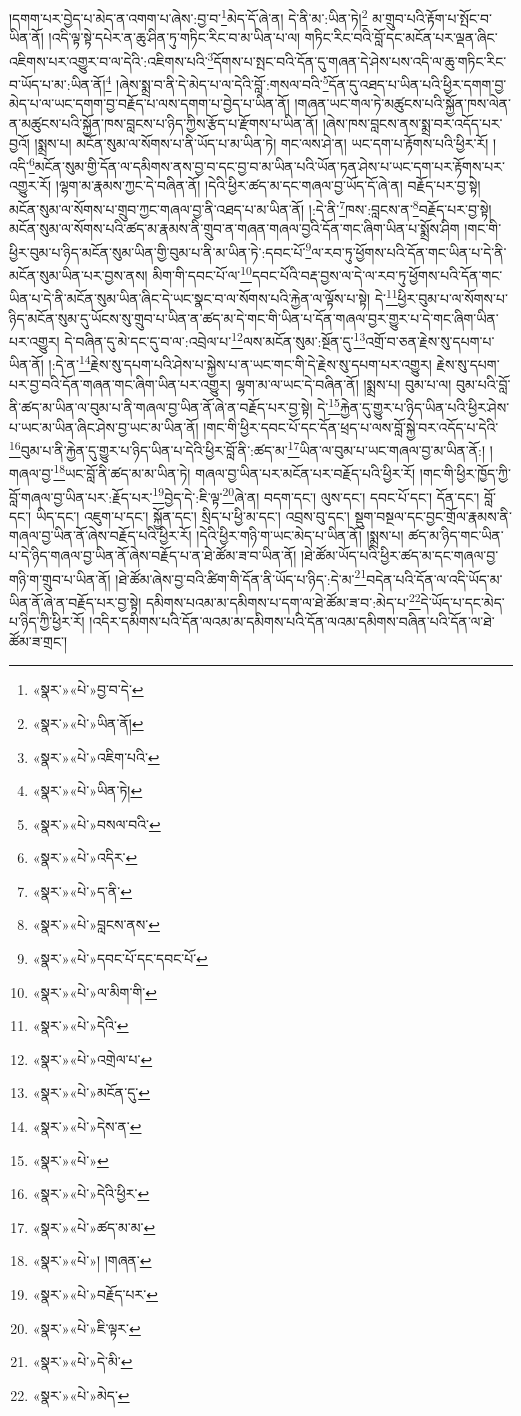 །དགག་པར་བྱེད་པ་མེད་ན་འགག་པ་ཞེས་:བྱ་བ་\footnote{«སྣར་»«པེ་»བྱ་བ་དེ་}མེད་དོ་ཞེ་ན། དེ་ནི་མ་:ཡིན་ཏེ།\footnote{«སྣར་»«པེ་»ཡིན་ནོ།} མ་གྲུབ་པའི་རྟོག་པ་སྤོང་བ་ཡིན་ནོ། །འདི་ལྟ་སྟེ་དཔེར་ན་ཆུ་ཤིན་ཏུ་གཏིང་རིང་བ་མ་ཡིན་པ་ལ། གཏིང་རིང་བའི་བློ་དང་མངོན་པར་ལྡན་ཞིང་འཇིགས་པར་འགྱུར་བ་ལ་དེའི་:འཇིགས་པའི་\footnote{«སྣར་»«པེ་»འཇིག་པའི་}དོགས་པ་སྤང་བའི་དོན་དུ་གཞན་དེ་ཤེས་པས་འདི་ལ་ཆུ་གཏིང་རིང་བ་ཡོད་པ་མ་:ཡིན་ནོ།\footnote{«སྣར་»«པེ་»ཡིན་ཏེ།} །ཞེས་སྨྲ་བ་ནི་དེ་མེད་པ་ལ་དེའི་བློ་:གསལ་བའི་\footnote{«སྣར་»«པེ་»བསལ་བའི་}དོན་དུ་འཐད་པ་ཡིན་པའི་ཕྱིར་དགག་བྱ་མེད་པ་ལ་ཡང་དགག་བྱ་བརྗོད་པ་ལས་དགག་པ་བྱེད་པ་ཡིན་ནོ། །གཞན་ཡང་གལ་ཏེ་མཚུངས་པའི་སྐྱོན་ཁས་ལེན་ན་མཚུངས་པའི་སྐྱོན་ཁས་བླངས་པ་ཉིད་ཀྱིས་རྩོད་པ་རྫོགས་པ་ཡིན་ནོ། །ཞེས་ཁས་བླངས་ནས་སྨྲ་བར་འདོད་པར་བྱའོ། །སྨྲས་པ། མངོན་སུམ་ལ་སོགས་པ་ནི་ཡོད་པ་མ་ཡིན་ཏེ། གང་ལས་ཤེ་ན། ཡང་དག་པ་རྟོགས་པའི་ཕྱིར་རོ། །འདི་\footnote{«སྣར་»«པེ་»འདིར་}མངོན་སུམ་གྱི་དོན་ལ་དམིགས་ནས་བྱ་བ་དང་བྱ་བ་མ་ཡིན་པའི་ཡོན་ཏན་ཤེས་པ་ཡང་དག་པར་རྟོགས་པར་འགྱུར་རོ། །ལྷག་མ་རྣམས་ཀྱང་དེ་བཞིན་ནོ། །དེའི་ཕྱིར་ཚད་མ་དང་གཞལ་བྱ་ཡོད་དོ་ཞེ་ན། བརྗོད་པར་བྱ་སྟེ། མངོན་སུམ་ལ་སོགས་པ་གྲུབ་ཀྱང་གཞལ་བྱ་ནི་འཐད་པ་མ་ཡིན་ནོ། །:དེ་ནི་\footnote{«སྣར་»«པེ་»ད་ནི་}ཁས་:བླངས་ན་\footnote{«སྣར་»«པེ་»བླངས་ནས་}བརྗོད་པར་བྱ་སྟེ། མངོན་སུམ་ལ་སོགས་པའི་ཚད་མ་རྣམས་ནི་གྲུབ་ན་གཞན་གཞལ་བྱའི་དོན་གང་ཞིག་ཡིན་པ་སྨྲོས་ཤིག །གང་གི་ཕྱིར་བུམ་པ་ཉིད་མངོན་སུམ་ཡིན་གྱི་བུམ་པ་ནི་མ་ཡིན་ཏེ་:དབང་པོ་\footnote{«སྣར་»«པེ་»དབང་པོ་དང་དབང་པོ་}ལ་རབ་ཏུ་ཕྱོགས་པའི་དོན་གང་ཡིན་པ་དེ་ནི་མངོན་སུམ་ཡིན་པར་བྱས་ནས། མིག་གི་དབང་པོ་ལ་\footnote{«སྣར་»«པེ་»ལ་མིག་གི་}དབང་པོའི་བརྡ་བྱས་ལ་དེ་ལ་རབ་ཏུ་ཕྱོགས་པའི་དོན་གང་ཡིན་པ་དེ་ནི་མངོན་སུམ་ཡིན་ཞིང་དེ་ཡང་སྣང་བ་ལ་སོགས་པའི་རྐྱེན་ལ་ལྟོས་པ་སྟེ། དེ་\footnote{«སྣར་»«པེ་»དེའི་}ཕྱིར་བུམ་པ་ལ་སོགས་པ་ཉིད་མངོན་སུམ་དུ་ཡོངས་སུ་གྲུབ་པ་ཡིན་ན་ཚད་མ་དེ་གང་གི་ཡིན་པ་དོན་གཞལ་བྱར་གྱུར་པ་དེ་གང་ཞིག་ཡིན་པར་འགྱུར། དེ་བཞིན་དུ་མེ་དང་དུ་བ་ལ་:འབྲེལ་པ་\footnote{«སྣར་»«པེ་»འགྲེལ་པ་}ལས་མངོན་སུམ་:སྔོན་དུ་\footnote{«སྣར་»«པེ་»མངོན་དུ་}འགྲོ་བ་ཅན་རྗེས་སུ་དཔག་པ་ཡིན་ནོ། །:དེ་ན་\footnote{«སྣར་»«པེ་»དེས་ན་}རྗེས་སུ་དཔག་པའི་ཤེས་པ་སྐྱེས་པ་ན་ཡང་གང་གི་དེ་རྗེས་སུ་དཔག་པར་འགྱུར། རྗེས་སུ་དཔག་པར་བྱ་བའི་དོན་གཞན་གང་ཞིག་ཡིན་པར་འགྱུར། ལྷག་མ་ལ་ཡང་དེ་བཞིན་ནོ། །སྨྲས་པ། བུམ་པ་ལ། བུམ་པའི་བློ་ནི་ཚད་མ་ཡིན་ལ་བུམ་པ་ནི་གཞལ་བྱ་ཡིན་ནོ་ཞེ་ན་བརྗོད་པར་བྱ་སྟེ། དེ་\footnote{«སྣར་»«པེ་»}རྐྱེན་དུ་གྱུར་པ་ཉིད་ཡིན་པའི་ཕྱིར་ཤེས་པ་ཡང་མ་ཡིན་ཞིང་ཤེས་བྱ་ཡང་མ་ཡིན་ནོ། །གང་གི་ཕྱིར་དབང་པོ་དང་དོན་ཕྲད་པ་ལས་བློ་སྐྱེ་བར་འདོད་པ་དེའི་\footnote{«སྣར་»«པེ་»དེའི་ཕྱིར་}བུམ་པ་ནི་རྐྱེན་དུ་གྱུར་པ་ཉིད་ཡིན་པ་དེའི་ཕྱིར་བློ་ནི་:ཚད་མ་\footnote{«སྣར་»«པེ་»ཚད་མ་མ་}ཡིན་ལ་བུམ་པ་ཡང་གཞལ་བྱ་མ་ཡིན་ནོ:། །གཞལ་བྱ་\footnote{«སྣར་»«པེ་»། །གཞན་}ཡང་བློ་ནི་ཚད་མ་མ་ཡིན་ཏེ། གཞལ་བྱ་ཡིན་པར་མངོན་པར་བརྗོད་པའི་ཕྱིར་རོ། །གང་གི་ཕྱིར་ཁྱོད་ཀྱི་བློ་གཞལ་བྱ་ཡིན་པར་:རྗོད་པར་\footnote{«སྣར་»«པེ་»བརྗོད་པར་}བྱེད་དེ་:ཇི་ལྟ་\footnote{«སྣར་»«པེ་»ཇི་ལྟར་}ཞེ་ན། བདག་དང་། ལུས་དང་། དབང་པོ་དང་། དོན་དང་། བློ་དང་། ཡིད་དང་། འཇུག་པ་དང་། སྐྱོན་དང་། སྲིད་པ་ཕྱི་མ་དང་། འབྲས་བུ་དང་། སྡུག་བསྔལ་དང་བྱང་གྲོལ་རྣམས་ནི་གཞལ་བྱ་ཡིན་ནོ་ཞེས་བརྗོད་པའི་ཕྱིར་རོ། །དེའི་ཕྱིར་གཉི་ག་ཡང་མེད་པ་ཡིན་ནོ། །སྨྲས་པ། ཚད་མ་ཉིད་གང་ཡིན་པ་དེ་ཉིད་གཞལ་བྱ་ཡིན་ནོ་ཞེས་བརྗོད་པ་ན་ཐེ་ཚོམ་ཟ་བ་ཡིན་ནོ། །ཐེ་ཚོམ་ཡོད་པའི་ཕྱིར་ཚད་མ་དང་གཞལ་བྱ་གཉི་ག་གྲུབ་པ་ཡིན་ནོ། །ཐེ་ཚོམ་ཞེས་བྱ་བའི་ཚིག་གི་དོན་ནི་ཡོད་པ་ཉིད་:དེ་མ་\footnote{«སྣར་»«པེ་»དེ་མི་}བདེན་པའི་དོན་ལ་འདི་ཡོད་མ་ཡིན་ནོ་ཞེ་ན་བརྗོད་པར་བྱ་སྟེ། དམིགས་པའམ་མ་དམིགས་པ་དག་ལ་ཐེ་ཚོམ་ཟ་བ་:མེད་པ་\footnote{«སྣར་»«པེ་»མེད་}དེ་ཡོད་པ་དང་མེད་པ་ཉིད་ཀྱི་ཕྱིར་རོ། །འདིར་དམིགས་པའི་དོན་ལའམ་མ་དམིགས་པའི་དོན་ལའམ་དམིགས་བཞིན་པའི་དོན་ལ་ཐེ་ཚོམ་ཟ་གྲང་། 